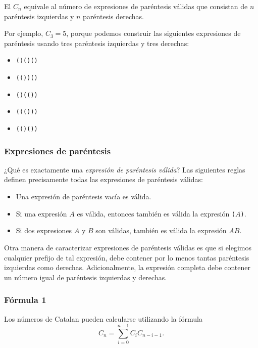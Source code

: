 
El  $C_n$ equivale al número de expresiones de
paréntesis válidas que consistan de $n$ paréntesis izquierdas y $n$
paréntesis derechas.

Por ejemplo, $C_3=5$, porque podemos construir las siguientes expresiones de
paréntesis usando tres paréntesis izquierdas y tres derechas:

\begin{itemize}[noitemsep]
    \item \texttt{()()()}
    \item \texttt{(())()}
    \item \texttt{()(())}
    \item \texttt{((()))}
    \item \texttt{(()())}
\end{itemize}

\subsubsection{Expresiones de paréntesis}


¿Qué es exactamente una \emph{expresión de paréntesis válida}? Las siguientes
reglas definen precisamente todas las expresiones de paréntesis válidas:

\begin{itemize}
    \item Una expresión de paréntesis vacía es válida.
    \item Si una expresión $A$ es válida, entonces también es válida la
          expresión \texttt{(}$A$\texttt{)}.
    \item Si dos expresiones $A$ y $B$ son válidas, también es
          válida la expresión $AB$.
\end{itemize}

Otra manera de caracterizar expresiones de paréntesis válidas es que si
elegimos cualquier prefijo de tal expresión, debe contener por lo menos
tantas paréntesis izquierdas como derechas. Adicionalmente, la expresión
completa debe contener un número igual de paréntesis izquierdas y derechas.

\subsubsection{Fórmula 1}

Los números de Catalan pueden calcularse utilizando la fórmula
\[ C_n = \sum_{i=0}^{n-1} C_{i} C_{n-i-1}.\]

